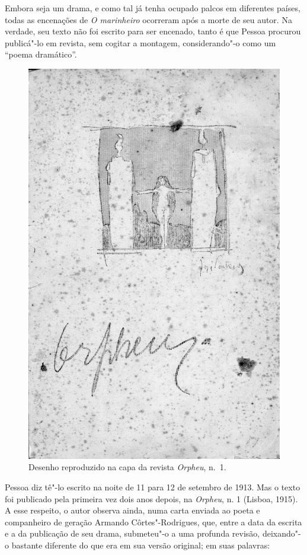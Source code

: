 Embora seja um drama, e como tal já tenha
ocupado palcos em diferentes
países, todas as encenações de \textit{O marinheiro}
ocorreram após a morte de seu autor.
Na verdade, seu texto não foi escrito para ser
encenado, tanto é que Pessoa procurou 
publicá"-lo em revista,
sem cogitar a montagem, considerando"-o como um “poema dramático”.  
\begin{figure}
\includegraphics[width=\textwidth]{2.png}
\caption{Desenho reproduzido na capa da revista \emph{Orpheu}, n.~1.}
\end{figure}

Pessoa diz tê"-lo escrito na noite de 11
para 12 de setembro de 1913. Mas o texto 
foi publicado pela primeira vez dois anos
depois, na
\textit{Orpheu}, n. 1 (Lisboa, 1915).
A esse respeito, o autor observa ainda, 
numa carta enviada ao poeta e companheiro de geração Armando
Côrtes"-Rodrigues, que, entre a data da escrita e a
da publicação de seu
drama, submeteu"-o a uma profunda revisão,
deixando"-o bastante diferente
do que era em sua versão original; em suas palavras:

